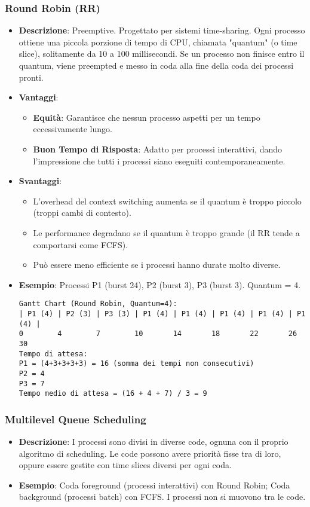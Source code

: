 \subsubsection{Round Robin (RR)}
\begin{itemize}
    \item \textbf{Descrizione}: Preemptive. Progettato per sistemi time-sharing. Ogni processo ottiene una piccola porzione di tempo di CPU, chiamata "quantum" (o time slice), solitamente da 10 a 100 millisecondi. Se un processo non finisce entro il quantum, viene preempted e messo in coda alla fine della coda dei processi pronti.
    \item \textbf{Vantaggi}:
    \begin{itemize}
        \item \textbf{Equità}: Garantisce che nessun processo aspetti per un tempo eccessivamente lungo.
        \item \textbf{Buon Tempo di Risposta}: Adatto per processi interattivi, dando l'impressione che tutti i processi siano eseguiti contemporaneamente.
    \end{itemize}
    \item \textbf{Svantaggi}:
    \begin{itemize}
        \item L'overhead del context switching aumenta se il quantum è troppo piccolo (troppi cambi di contesto).
        \item Le performance degradano se il quantum è troppo grande (il RR tende a comportarsi come FCFS).
        \item Può essere meno efficiente se i processi hanno durate molto diverse.
    \end{itemize}
    \item \textbf{Esempio}: Processi P1 (burst 24), P2 (burst 3), P3 (burst 3). Quantum = 4.
    \begin{lstlisting}[numbers=none, language=Pseudocode]
Gantt Chart (Round Robin, Quantum=4):
| P1 (4) | P2 (3) | P3 (3) | P1 (4) | P1 (4) | P1 (4) | P1 (4) | P1 (4) |
0        4        7        10       14       18       22       26       30
Tempo di attesa:
P1 = (4+3+3+3+3) = 16 (somma dei tempi non consecutivi)
P2 = 4
P3 = 7
Tempo medio di attesa = (16 + 4 + 7) / 3 = 9
    \end{lstlisting}
\end{itemize}

\subsubsection{Multilevel Queue Scheduling}
\begin{itemize}
    \item \textbf{Descrizione}: I processi sono divisi in diverse code, ognuna con il proprio algoritmo di scheduling. Le code possono avere priorità fisse tra di loro, oppure essere gestite con time slices diversi per ogni coda.
    \item \textbf{Esempio}: Coda foreground (processi interattivi) con Round Robin; Coda background (processi batch) con FCFS. I processi non si muovono tra le code.
\end{itemize}

